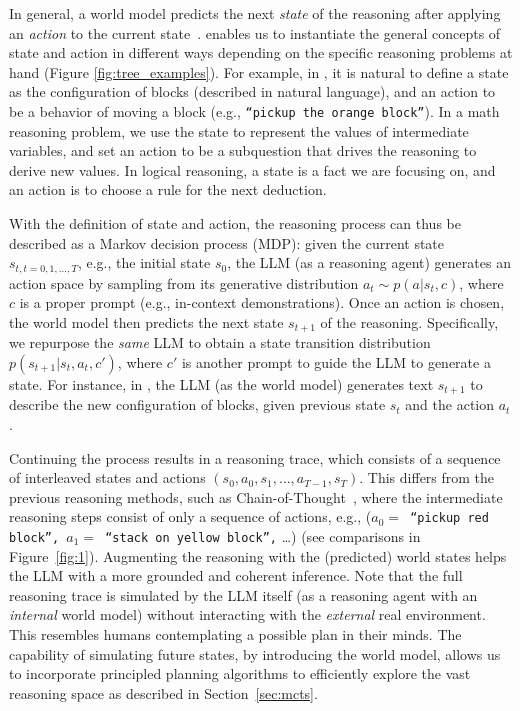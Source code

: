 In general, a world model predicts the next \emph{state} of the reasoning after applying an \emph{action} to the current state~\cite{ha2018world, matsuo2022deep}. \ours enables us to instantiate the general concepts of state and action in different ways depending on the specific reasoning problems at hand (Figure \ref{fig:tree_examples}). For example, in \blocksworld, it is natural to define a state as the configuration of blocks (described in natural language), and an action to be a behavior of moving a block (e.g., \texttt{``pickup the orange block''}). In a math reasoning problem, we use the state to represent the values of intermediate variables, and set an action to be a subquestion that drives the reasoning to derive new values. In logical reasoning, a state is a fact we are focusing on, and an action is to choose a rule for the next deduction.


With the definition of state and action, the reasoning process can thus be described as a Markov decision process (MDP): given the current state $s_{t, t=0, 1, \dots, T}$, e.g., the initial state $s_0$, the LLM (as a reasoning agent) generates an action space by sampling from its generative distribution $a_t \sim p(a | s_t, c)$, where $c$ is a proper prompt (e.g., in-context demonstrations). Once an action is chosen, the world model then predicts the next state $s_{t+1}$ of the reasoning. Specifically, we repurpose the \emph{same} LLM to obtain a state transition distribution $p(s_{t+1} | s_t, a_t, c')$, where $c'$ is another prompt to guide the LLM to generate a state. For instance, in \blocksworld, the LLM (as the world model) generates text $s_{t+1}$ to describe the new configuration of blocks, given previous state $s_{t}$ and the action $a_t$. 

Continuing the process results in a reasoning trace, which consists of a sequence of interleaved states and actions $(s_0, a_0, s_1, \dots, a_{T-1}, s_T)$. This differs from the previous reasoning methods, such as Chain-of-Thought~\cite{wei2022chain}, where the intermediate reasoning steps consist of only a sequence of actions, e.g., (\texttt{$a_0=$ ``pickup red block'', $a_1=$ ``stack on yellow block'',} \dots) (see comparisons in Figure~\ref{fig:1}). Augmenting the reasoning with the (predicted) world states helps the LLM with a more grounded and coherent inference. Note that the full reasoning trace is simulated by the LLM itself (as a reasoning agent with an \emph{internal} world model) without interacting with the \emph{external} real environment. This resembles humans contemplating a possible plan in their minds. The capability of simulating future states, by introducing the world model, allows us to incorporate principled planning algorithms to efficiently explore the vast reasoning space as described in Section~\ref{sec:mcts}.
 


